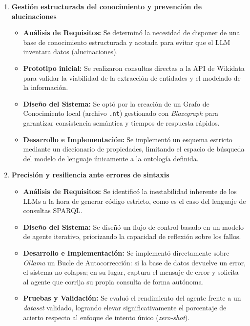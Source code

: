 \begin{enumerate}
    \item \textbf{Gestión estructurada del conocimiento y prevención de alucinaciones}
    \begin{itemize}
        \item \textbf{Análisis de Requisitos:} Se determinó la necesidad de disponer de una base de conocimiento estructurada y acotada para evitar que el LLM inventara datos (alucinaciones).
        \item \textbf{Prototipo inicial:} Se realizaron consultas directas a la API de Wikidata para validar la viabilidad de la extracción de entidades y el modelado de la información.
        \item \textbf{Diseño del Sistema:} Se optó por la creación de un Grafo de Conocimiento local (archivo \texttt{.nt}) gestionado con \textit{Blazegraph} para garantizar consistencia semántica y tiempos de respuesta rápidos.
        \item \textbf{Desarrollo e Implementación:} Se implementó un esquema estricto mediante un diccionario de propiedades, limitando el espacio de búsqueda del modelo de lenguaje únicamente a la ontología definida.
    \end{itemize}

    \item \textbf{Precisión y resiliencia ante errores de sintaxis}
    \begin{itemize}
        \item \textbf{Análisis de Requisitos:} Se identificó la inestabilidad inherente de los LLMs a la hora de generar código estricto, como es el caso del lenguaje de consultas SPARQL.
        \item \textbf{Diseño del Sistema:} Se diseñó un flujo de control basado en un modelo de agente iterativo, priorizando la capacidad de reflexión sobre los fallos.
        \item \textbf{Desarrollo e Implementación:} Se implementó directamente sobre \textit{Ollama} un Bucle de Autocorrección: si la base de datos devuelve un error, el sistema no colapsa; en su lugar, captura el mensaje de error y solicita al agente que corrija su propia consulta de forma autónoma.
        \item \textbf{Pruebas y Validación:} Se evaluó el rendimiento del agente frente a un \textit{dataset} validado, logrando elevar significativamente el porcentaje de acierto respecto al enfoque de intento único (\textit{zero-shot}).
    \end{itemize}


\end{enumerate}
